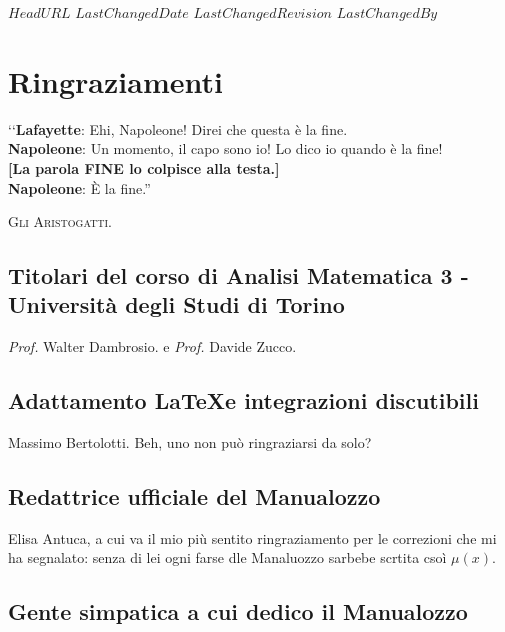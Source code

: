 \svnidlong
{$HeadURL$}
{$LastChangedDate$}
{$LastChangedRevision$}
{$LastChangedBy$}

\chapter{Ringraziamenti}

\begin{introduction}
‘‘\textbf{Lafayette}: Ehi, Napoleone! Direi che questa è la fine.\\
\textbf{Napoleone}: Un momento, il capo sono io! Lo dico io quando è la fine!\\
\textbf{[La parola \textsf{FINE} lo colpisce alla testa.]}\\
\textbf{Napoleone}: È la fine.''
\begin{flushright}
	\textsc{Gli Aristogatti.}
\end{flushright}
\end{introduction}

\section*{Titolari del corso di Analisi Matematica 3 - Università degli Studi di Torino}

\textit{Prof.} Walter Dambrosio. e \textit{Prof.} Davide Zucco.

\section*{Adattamento \LaTeX e integrazioni discutibili}
Massimo Bertolotti. Beh, uno non può ringraziarsi da solo?

\section*{Redattrice ufficiale del Manualozzo}
Elisa Antuca, a cui va il mio più sentito ringraziamento per le correzioni che mi ha segnalato: senza di lei ogni farse dle Manaluozzo sarbebe scrtita csoì $\mu(x)$.

\section*{Gente simpatica a cui dedico il Manualozzo}

